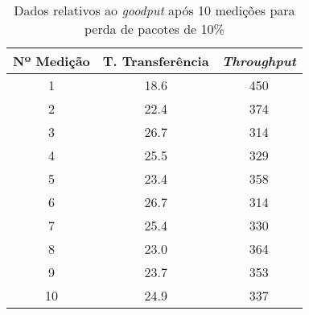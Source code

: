 \begin{table}[!ht]
\centering

\begin{tabular}{c c c}
\toprule
\toprule
	Nº Medição & T. Transferência & \emph{Throughput} \\ 
\midrule
1 & 18.6 & 450\\
2 & 22.4 & 374\\
3 & 26.7 & 314\\
4 & 25.5 & 329\\
5 & 23.4 & 358\\
6 & 26.7 & 314\\
7 & 25.4 & 330\\
8 & 23.0 & 364\\
9 & 23.7 & 353\\
10 & 24.9 & 337\\
\bottomrule
\end{tabular}
\caption{Dados relativos ao \emph{goodput} após 10 medições para perda de pacotes de 10\%}
\label{tab:loss10}
\end{table}

